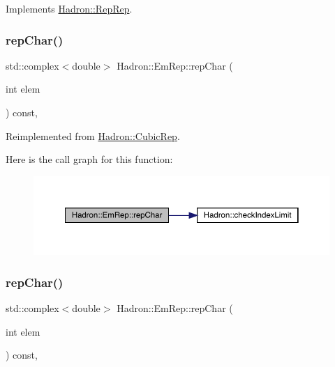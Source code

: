 Implements \mbox{\hyperlink{structHadron_1_1RepRep_ab3213025f6de249f7095892109575fde}{Hadron\+::\+Rep\+Rep}}.

\mbox{\label{structHadron_1_1EmRep_ab57e91b1997f75e0eff8a03bac6f34db}} 
\subsubsection{\texorpdfstring{repChar()}{repChar()}\hspace{0.1cm}{\footnotesize\ttfamily [1/2]}}
{\footnotesize\ttfamily std\+::complex$<$double$>$ Hadron\+::\+Em\+Rep\+::rep\+Char (\begin{DoxyParamCaption}\item[{int}]{elem }\end{DoxyParamCaption}) const\hspace{0.3cm}{\ttfamily [inline]}, {\ttfamily [virtual]}}



Reimplemented from \mbox{\hyperlink{structHadron_1_1CubicRep_af45227106e8e715e84b0af69cd3b36f8}{Hadron\+::\+Cubic\+Rep}}.

Here is the call graph for this function\+:
\nopagebreak
\begin{figure}[H]
\begin{center}
\leavevmode
\includegraphics[width=350pt]{d6/d4b/structHadron_1_1EmRep_ab57e91b1997f75e0eff8a03bac6f34db_cgraph}
\end{center}
\end{figure}
\mbox{\label{structHadron_1_1EmRep_ab57e91b1997f75e0eff8a03bac6f34db}} 
\subsubsection{\texorpdfstring{repChar()}{repChar()}\hspace{0.1cm}{\footnotesize\ttfamily [2/2]}}
{\footnotesize\ttfamily std\+::complex$<$double$>$ Hadron\+::\+Em\+Rep\+::rep\+Char (\begin{DoxyParamCaption}\item[{int}]{elem }\end{DoxyParamCaption}) const\hspace{0.3cm}{\ttfamily [inline]}, {\ttfamily [virtual]}}



